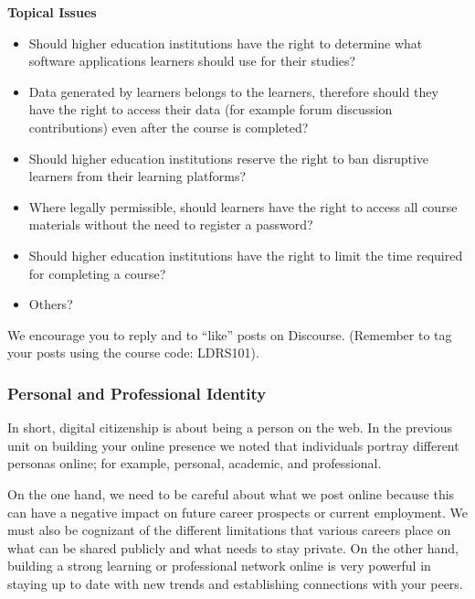 \documentclass[
  letterpaper,
  DIV=11,
  numbers=noendperiod]{scrreprt}
\providecommand{\tightlist}{%
  \setlength{\itemsep}{0pt}\setlength{\parskip}{0pt}}\usepackage{longtable,booktabs,array}
\begin{document}
\begin{tcolorbox}
\textbf{Topical Issues}

\begin{itemize}
\tightlist
\item
  Should higher education institutions have the right to determine what
  software applications learners should use for their studies?
\item
  Data generated by learners belongs to the learners, therefore should
  they have the right to access their data (for example forum discussion
  contributions) even after the course is completed?
\item
  Should higher education institutions reserve the right to ban
  disruptive learners from their learning platforms?
\item
  Where legally permissible, should learners have the right to access
  all course materials without the need to register a password?
\item
  Should higher education institutions have the right to limit the time
  required for completing a course?
\item
  Others?
\end{itemize}

We encourage you to reply and to ``like'' posts on Discourse. (Remember
to tag your posts using the course code: LDRS101).

\end{tcolorbox}

\subsubsection*{Personal and Professional
Identity}\label{personal-and-professional-identity}

In short, digital citizenship is about being a person on the web. In the
previous unit on building your online presence we noted that individuals
portray different personas online; for example, personal, academic, and
professional.

On the one hand, we need to be careful about what we post online because
this can have a negative impact on future career prospects or current
employment. We must also be cognizant of the different limitations that
various careers place on what can be shared publicly and what needs to
stay private. On the other hand, building a strong learning or
professional network online is very powerful in staying up to date with
new trends and establishing connections with your peers.
\end{document}
